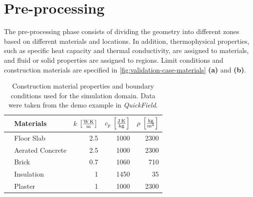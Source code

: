 \section{Pre-processing}
The pre-processing phase consists of dividing the geometry into different zones based on different materials and locations. In addition, thermophysical properties, such as specific heat capacity and thermal conductivity, are assigned to materials, and fluid or solid properties are assigned to regions. Limit conditions and construction materials are specified in \ref{fig:validation-case-materials} \textbf{(a)} and \textbf{(b)}. 





\begin{table}[tbh]
    \centering
    \label{tab:construction_material_properties}
    \caption[3D Material Properties]{Construction material properties and boundary conditions used for the simulation domain. Data were taken from the demo example in \textit{QuickField}.}
      \centering
        \begin{tabular}{clrrr}    
            \toprule   
            & Materials       & $k$ $\left[ \si[per-mode=fraction]{\watt\per\metre\kelvin} \right]$ & $c_p$   $\left[ \si[per-mode=fraction]{\joule\per\kilogram\kelvin}\right]$ & $\rho$  $\left[ \si[per-mode=fraction]{\kilogram\per\cubic\metre} \right]$   \\
            \midrule
            & Floor Slab        & 2.5                        & 1000                      & 2300               \\
            & Aerated Concrete  & 2.5                        & 1000                      & 2300               \\
            & Brick             & 0.7                        & 1060                       & 710               \\
            & Insulation        & 1                         & 1450                      & 35               \\
            & Plaster           & 1                         & 1000                      & 2300              \\
            \bottomrule
        \end{tabular}
  
\end{table}


